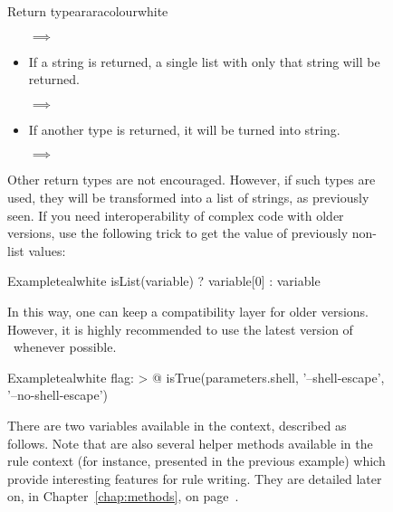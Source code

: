 \begin{description}
\begin{description}
\begin{messagebox}{Return type}{araracolour}{\icinfo}{white}
\begin{itemize}[label={--}]
\rbox[araracolour]{\hspace{1ex}[ 'a', 1, [ 2, 'b' ] ]\hspace{1ex}} $\implies$ \rbox[araracolour]{\hspace{1ex}[ 'a', '1', '2', 'b' ]\hspace{1ex}}

\item If a string is returned, a single list with only that string will be returned.

 $\implies$ 

\item If another type is returned, it will be turned into string.

 $\implies$ \rbox[araracolour]{\hspace{1ex}[ '3.1415' ]\hspace{1ex}}
\end{itemize}

Other return types are not encouraged. However, if such types are used, they will be transformed into a list of strings, as previously seen. If you need interoperability of complex  code with older versions, use the following trick to get the value of previously non-list values:

\begin{codebox}{Example}{teal}{\icnote}{white}
isList(variable) ? variable[0] : variable
\end{codebox}

In this way, one can keep a compatibility layer for older versions. However, it is highly recommended to use the latest version of \arara\ whenever possible.

\end{messagebox}

\begin{codebox}{Example}{teal}{\icnote}{white}
flag: >
  @{
      isTrue(parameters.shell, '--shell-escape',
             '--no-shell-escape')
  }
\end{codebox}

There are two variables available in the  context, described as follows. Note that are also several helper methods available in the rule context (for instance,  presented in the previous example) which provide interesting features for rule writing. They are detailed later on, in Chapter~\ref{chap:methods}, on page~\pageref{chap:methods}.


\end{description}
\end{description}
